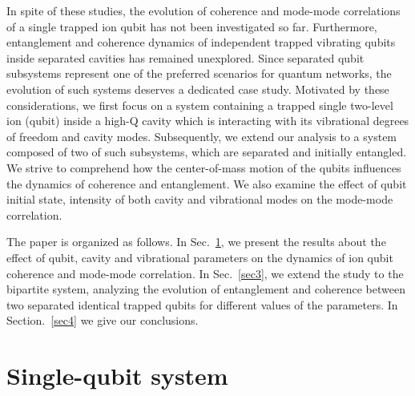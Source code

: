 \documentclass[twocolumn,3p,times]{elsarticle}
\begin{document}
In spite of these studies, the evolution of coherence and mode-mode correlations of a single trapped ion qubit has not been investigated so far. Furthermore, entanglement and coherence dynamics of independent trapped vibrating qubits inside  separated cavities has remained unexplored. Since separated qubit subsystems represent one of the preferred scenarios for quantum networks, the evolution of such systems deserves a dedicated case study.
Motivated by these considerations, we first focus on a system containing a trapped single two-level ion (qubit) inside a high-Q cavity which is interacting with its vibrational degrees of freedom and cavity modes. Subsequently, we extend our analysis to a system composed of two of such subsystems, which are separated and initially entangled. We strive to comprehend how the center-of-mass motion of the qubits influences the dynamics of coherence and entanglement. We also examine the effect of qubit initial state, intensity of both cavity and vibrational modes on the mode-mode correlation.

The paper is organized as follows. In Sec.~\ref{sec2}, we present the results about the effect of qubit, cavity and vibrational parameters on the dynamics of ion qubit coherence and mode-mode correlation. In Sec.~\ref{sec3}, we extend the study to the bipartite system, analyzing the evolution of entanglement and coherence between two separated identical trapped qubits for different values of the parameters. In Section.~\ref{sec4} we give our conclusions.


\section{Single-qubit system}\label{sec2}
\end{document}
